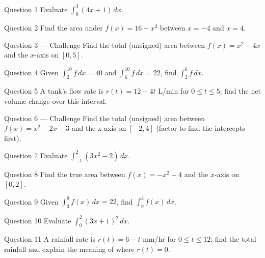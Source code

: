 \documentclass[11pt]{article}
\begin{document}
\begin{qbox}{Question 1}
Evaluate $\displaystyle\int_0^3(4x+1)\,dx$.\workspace{2.4cm}
\end{qbox}

\begin{qbox}{Question 2}
Find the area under $f(x)=16-x^2$ between $x=-4$ and $x=4$.\workspace{2.4cm}
\end{qbox}

\begin{qbox}{Question 3 --- Challenge}
Find the total (unsigned) area between $f(x)=x^2-4x$ and the $x$-axis on $[0,5]$.\workspace{3.4cm}
\end{qbox}

\begin{qbox}{Question 4}
Given $\int_2^{10}f\,dx=40$ and $\int_6^{10}f\,dx=22$, find $\int_2^6f\,dx$.\workspace{2.4cm}
\end{qbox}

\begin{qbox}{Question 5}
A tank's flow rate is $r(t)=12-4t$ L/min for $0\leq t\leq5$; find the net volume change over this interval.\workspace{2.4cm}
\end{qbox}

\begin{qbox}{Question 6 --- Challenge}
Find the total (unsigned) area between $f(x)=x^2-2x-3$ and the x-axis on $[-2,4]$ (factor to find the intercepts first).\workspace{3.4cm}
\end{qbox}

\begin{qbox}{Question 7}
Evaluate $\displaystyle\int_{-1}^{2}(3x^2-2)\,dx$.\workspace{2.4cm}
\end{qbox}

\begin{qbox}{Question 8}
Find the true area between $f(x)=-x^2-4$ and the $x$-axis on $[0,2]$.\workspace{2.4cm}
\end{qbox}

\begin{qbox}{Question 9}
Given $\displaystyle\int_3^9f(x)\,dx=22$, find $\displaystyle\int_9^3f(x)\,dx$.\workspace{2.4cm}
\end{qbox}

\begin{qbox}{Question 10}
Evaluate $\displaystyle\int_0^2(3x+1)^2\,dx$.\workspace{2.4cm}
\end{qbox}

\begin{qbox}{Question 11}
A rainfall rate is $r(t)=6-t$ mm/hr for $0\leq t\leq12$; find the total rainfall and explain the meaning of where $r(t)=0$.\workspace{2.4cm}
\end{qbox}
\end{document}
